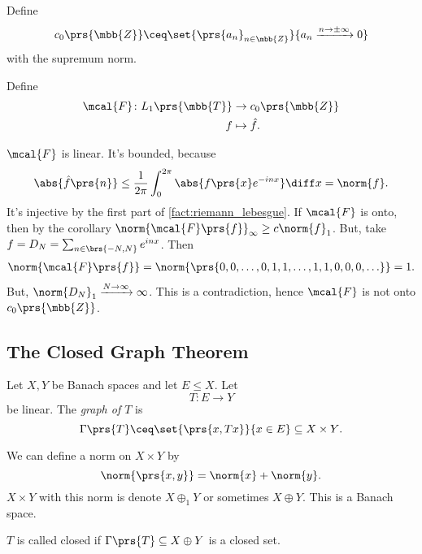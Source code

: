 \documentclass[10pt, twoside]{book}
\begin{document}
\begin{definition}
Define
\[c_0\prs{\mbb{Z}} \ceq \set{\prs{a_n}_{n \in \mbb{Z}}}{a_n \xrightarrow{n\to\pm\infty} 0}\]
with the supremum norm.
\end{definition}

\begin{definition}
Define
\begin{align*}
\mcal{F} \colon L_1\prs{\mbb{T}} &\to c_0\prs{\mbb{Z}} \\
f &\mapsto \hat{f} \text{.}
\end{align*}
\end{definition}

\begin{remark}
$\mcal{F}$ is linear. It's bounded, because
\[\abs{\hat{f}\prs{n}} \leq \frac{1}{2\pi} \int_0^{2\pi} \abs{f\prs{x} e^{-inx}} \diff x = \norm{f} \text{.}\]
It's injective by the first part of \ref{fact:riemann_lebesgue}.
If $\mcal{F}$ is onto, then by the corollary $\norm{\mcal{F}\prs{f}}_\infty \geq c\norm{f}_1$.
But, take $f = D_N = \sum_{n \in \brs{-N,N}} e^{inx}$. Then
\begin{align*}
\norm{\mcal{F}\prs{f}} = \norm{\prs{0,0,\ldots, 0, 1, 1, \ldots, 1, 1, 0, 0, 0, \ldots}} = 1 \text{.}
\end{align*}
But, $\norm{D_N}_1 \xrightarrow{N\to\infty} \infty$.
This is a contradiction, hence $\mcal{F}$ is not onto $c_0\prs{\mbb{Z}}$.
\end{remark}

\subsection{The Closed Graph Theorem}

\begin{definition}
Let $X,Y$ be Banach spaces and let $E \leq X$. Let
\[T \colon E \to Y\]
be linear. The \emph{graph of $T$} is
\[\Gamma\prs{T} \ceq \set{\prs{x, Tx}}{x \in E} \subseteq X \times Y \text{.}\]
\end{definition}

\begin{remark}
We can define a norm on $X \times Y$ by
\[\norm{\prs{x,y}} = \norm{x} + \norm{y} \text{.}\]
$X \times Y$ with this norm is denote $X \oplus_1 Y$ or sometimes $X \oplus Y$. This is a Banach space.
\end{remark}

\begin{definition}
$T$ is called closed if $\Gamma\prs{T} \subseteq X \oplus Y$ is a closed set.
\end{definition}
\end{document}
